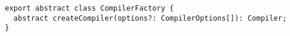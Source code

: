 \begin{verbatim}
export abstract class CompilerFactory {
  abstract createCompiler(options?: CompilerOptions[]): Compiler;
}
\end{verbatim}
